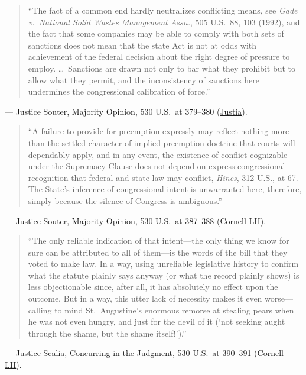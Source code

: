 \documentclass[12pt]{article}
\begin{document}
\begin{quote}
``The fact of a common end hardly neutralizes conflicting means, see \textit{Gade v.\ National Solid Wastes Management Assn.}, 505 U.S.\ 88, 103 (1992), and the fact that some companies may be able to comply with both sets of sanctions does not mean that the state Act is not at odds with achievement of the federal decision about the right degree of pressure to employ. \dots\ Sanctions are drawn not only to bar what they prohibit but to allow what they permit, and the inconsistency of sanctions here undermines the congressional calibration of force.''
\end{quote}
\noindent --- Justice Souter, Majority Opinion, 530 U.S.\ at 379--380 (\href{https://supreme.justia.com/cases/federal/us/530/363/}{Justia}).

\begin{quote}
``A failure to provide for preemption expressly may reflect nothing more than the settled character of implied preemption doctrine that courts will dependably apply, and in any event, the existence of conflict cognizable under the Supremacy Clause does not depend on express congressional recognition that federal and state law may conflict, \textit{Hines}, 312 U.S., at 67. The State's inference of congressional intent is unwarranted here, therefore, simply because the silence of Congress is ambiguous.''
\end{quote}
\noindent --- Justice Souter, Majority Opinion, 530 U.S.\ at 387--388 (\href{https://www.law.cornell.edu/supct/html/99-474.ZO.html}{Cornell LII}).

\begin{quote}
``The only reliable indication of that intent---the only thing we know for sure can be attributed to all of them---is the words of the bill that they voted to make law. In a way, using unreliable legislative history to confirm what the statute plainly says anyway (or what the record plainly shows) is less objectionable since, after all, it has absolutely no effect upon the outcome. But in a way, this utter lack of necessity makes it even worse---calling to mind St.\ Augustine's enormous remorse at stealing pears when he was not even hungry, and just for the devil of it (`not seeking aught through the shame, but the shame itself!').''
\end{quote}
\noindent --- Justice Scalia, Concurring in the Judgment, 530 U.S.\ at 390--391 (\href{https://www.law.cornell.edu/supct/html/99-474.ZC.html}{Cornell LII}).
\end{document}

